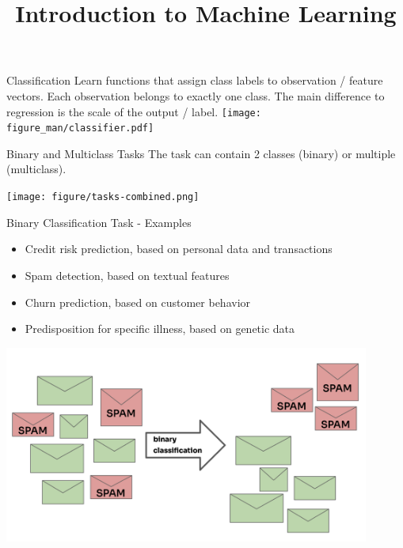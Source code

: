 \documentclass[11pt,compress,t,notes=noshow, xcolor=table]{beamer}
\title{Introduction to Machine Learning}
\begin{document}

\begin{vbframe}{Classification}
Learn functions that assign class labels to observation / feature vectors. Each observation belongs to exactly one class. The main difference to regression is the scale of the output / label.
{\centering \texttt{[image: figure\_man/classifier.pdf]}}

\end{vbframe}

\begin{vbframe}{Binary and Multiclass Tasks}
The task can contain 2 classes (binary) or multiple (multiclass).

\begin{center}
\texttt{[image: figure/tasks-combined.png]}
\end{center}

\end{vbframe}


\begin{vbframe}{Binary Classification Task - Examples}

  \begin{itemize}
  \item Credit risk prediction, based on personal data and transactions
  \item Spam detection, based on textual features
  \item Churn prediction, based on customer behavior
  \item Predisposition for specific illness, based on genetic data
\end{itemize}

\begin{center}
  \includegraphics[width=0.9\textwidth]{figure_man/spam.png}
\end{center}
\end{vbframe}
\end{document}
